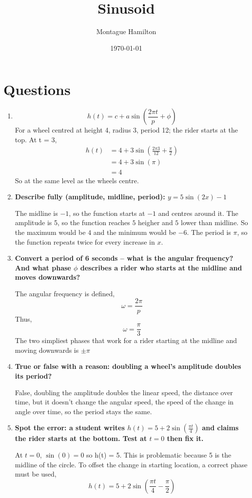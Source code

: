 \documentclass{article}
\begin{document}
\title{Sinusoid}
\author{Montague Hamilton}
\date{\today}
\maketitle

\section{Questions}
\begin{enumerate}[itemsep=12pt]
  \item
    \[
    h(t) = c + a \sin\left(\frac{2\pi t}{p} + \phi \right)
    \]
 For a wheel centred at height 4, radius 3, period 12; the rider starts at the top. At t = 3,
 \begin{align*}
 h(t) &= 4 + 3 \sin \left(\frac{2 \pi 3}{12} + \frac{\pi}{2} \right) \\
   &= 4 + 3 \sin(\pi) \\
   &= 4
 \end{align*}
 So at the same level as the wheels centre.

\item \textbf{Describe fully (amplitude, midline, period): $y = 5\sin(2x) - 1$}

   The midline is $-1$, so the function starts at $-1$ and centres around it. 
   The amplitude is 5, so the function reaches $5$ heigher and $5$ lower than midline. 
   So the maximum would be $4$ and the minimum would be $-6$. 
   The period is $\pi$, so the function repeats twice for every increase in $x$.


 \item \textbf{Convert a period of 6 seconds -- what is the angular frequency? 
   And what phase $\phi$ describes a rider who starts at the midline and moves downwards?}

   The angular frequency is defined,
    \[
       \omega = \frac{2\pi}{p}
    \]
    Thus,
    \[
      \omega = \frac{\pi}{3}
    \]
   The two simpliest phases that work for a rider starting at the midline and moving downwards is $\pm \pi$
      
 \item \textbf{True or false with a reason: doubling a wheel's amplitude doubles its period?}

   False, doubling the amplitude doubles the linear speed, the distance over time, but it doesn't change the angular speed,
   the speed of the change in angle over time, so the period stays the same.

 \item \textbf{Spot the error: a student writes $h(t) = 5 + 2\sin \left(\frac{\pi t}{4} \right)$ 
   and claims the rider starts at the bottom. Test at $t = 0$ then fix it.}

   At $t = 0$, $\sin(0) = 0$ so h(t) = 5. This is problematic because 5 is the midline of the circle.
   To offset the change in starting location, a correct phase must be used,
   \[
     h(t) = 5 + 2\sin \left(\frac{\pi t}{4} - \frac{\pi}{2} \right)
   \]
   
\end{enumerate}
\end{document}
